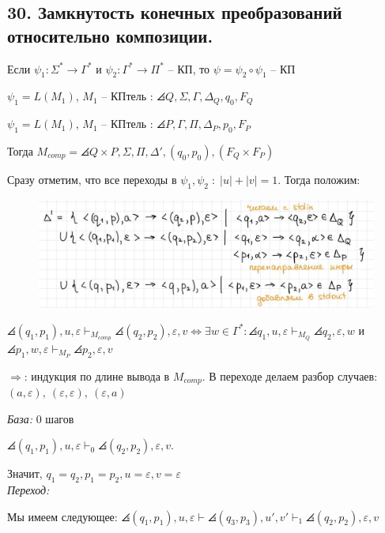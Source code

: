 \subsection{30. Замкнутость конечных преобразований относительно композиции.}

\Th Если $\psi_1:\Sigma^* \rightarrow \Gamma^*$ и $\psi_2:\Gamma^* \rightarrow \Pi^*$ -- КП, то $\psi = \psi_2 \circ \psi_1$ -- КП

\Proof
$\psi_1=L(M_1)$, $M_1$ -- КПтель : $\angles{Q, \Sigma, \Gamma, \Delta_Q, q_0, F_Q}$

 $\psi_1=L(M_1)$, $M_1$ -- КПтель : $\angles{P, \Gamma, \Pi, \Delta_P, p_0, F_P}$

Тогда $M_{comp} = \angles{Q \times P, \Sigma, \Pi, \Delta', (q_0,p_0), (F_Q\times F_P)}$

Сразу отметим, что все переходы в $\psi_1, \psi_2 \; : \; |u| + |v| = 1$. Тогда положим:
\begin{figure}[h!]
    \centering
    \includegraphics[scale=0.6]{images/delta.jpg}
\end{figure}

\Lemma $\angles{(q_1,p_1), u, \varepsilon} \vdash_{M_{comp}} \angles{(q_2,p_2), \varepsilon, v} \Longleftrightarrow \exists w\in \Gamma^* : \angles{q_1, u, \varepsilon} \vdash_{M_Q} \angles{q_2,\varepsilon, w}$ и $\angles{p_1, w, \varepsilon} \vdash_{M_P} \angles{p_2,\varepsilon, v}$

$\Longrightarrow$: индукция по длине вывода в $M_{comp}$. В переходе делаем разбор случаев: $(a, \varepsilon), \ (\varepsilon, \varepsilon), \ (\varepsilon, a)$

\Proof
\textit{База:} 0 шагов

$\angles{(q_1,p_1), u, \varepsilon} \vdash_0 \angles{(q_2,p_2), \varepsilon, v}$. 

Значит, $q_1 = q_2, p_1 = p_2, u = \varepsilon, v = \varepsilon$\\

\textit{Переход:}

Мы имеем следующее: $\angles{(q_1,p_1), u, \varepsilon} \vdash \angles{(q_3,p_3), u', v'} \vdash_1 \angles{(q_2,p_2), \varepsilon, v}$

